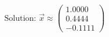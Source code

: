 \documentclass[preview]{standalone}
\begin{document}
\begin{align*}
\text{Solution: } \vec{x} \approx \begin{pmatrix} 1.0000 \\ 0.4444 \\ -0.1111 \end{pmatrix}
\end{align*}
\end{document}
